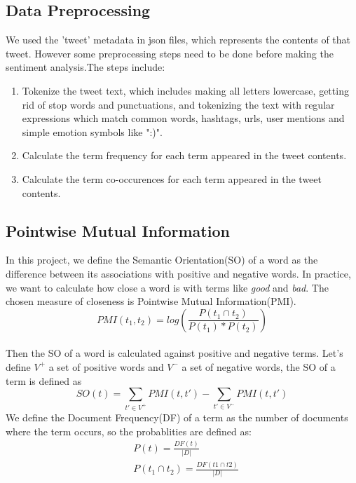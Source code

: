 \documentclass{article}
\begin{document}
\subsection{Data Preprocessing}
We used the 'tweet' metadata in json files, which represents the contents of that tweet. However some preprocessing steps need to be done before making the sentiment analysis.The steps include:\\
\begin{enumerate}
\item Tokenize the tweet text, which includes making all letters lowercase, getting rid of stop words and punctuations, and tokenizing the text with regular expressions which match common words, hashtags, urls, user mentions and simple emotion symbols like ":)".
\item Calculate the term frequency for each term appeared in the tweet contents.
\item Calculate the term co-occurences for each term appeared in the tweet contents.
\end{enumerate}
\subsection{Pointwise Mutual Information}
In this project, we define the Semantic Orientation(SO) of a word as the difference between its associations with positive and negative words. In practice, we want to calculate how close a word is with terms like \emph{good} and \emph{bad}. The chosen measure of closeness is Pointwise Mutual Information(PMI).\\
\begin{equation*}
PMI(t_1, t_2) = log\left( \frac{P(t_1\cap t_2)}{P(t_1)*P(t_2)}\right) 
\end{equation*} 
\\
Then the SO of a word is calculated against positive and negative terms. Let's define $V^+$ a set of positive words and $V^-$ a set of negative words, the SO of a term is defined as 
\begin{equation*}
SO(t) = \sum_{t'\in V^+}PMI(t, t')-\sum_{t'\in V^-}PMI(t, t')
\end{equation*}
We define the Document Frequency(DF) of a term as the number of documents where the term occurs, so the probablities are defined as:
\begin{equation*}
\begin{split}
&P(t) =\frac{DF(t)}{|D|}\\
&P(t_1\cap t_2) = \frac{DF(t1\cap t2)}{|D|}
\end{split}
\end{equation*}
\end{document}
